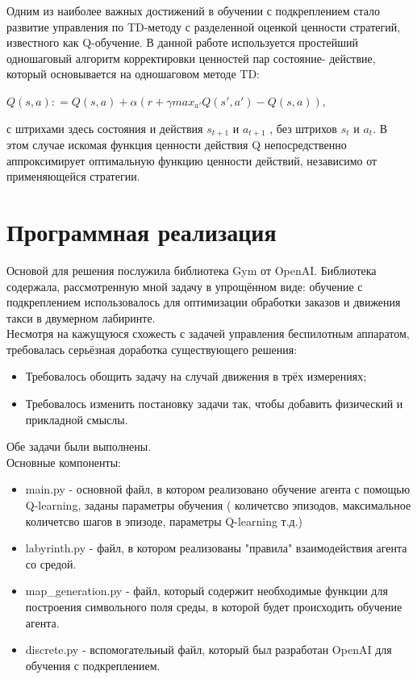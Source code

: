 \documentclass[12pt, a4paper]{report}
\theoremstyle{definition}
\theoremstyle{plain}
\theoremstyle{remark}
\theoremstyle{remark}
\theoremstyle{definition}
\begin{document}
Одним из наиболее важных достижений в обучении с подкреплением стало развитие управления по TD-методу с разделенной оценкой ценности
стратегий, известного как Q-обучение. В данной работе используется простейший одношаговый алгоритм корректировки ценностей пар состояние-
действие, который основывается на одношаговом методе TD:
\begin{center}
	$ Q(s, a): = Q(s, a) + \alpha(r + \gamma max_{a'} Q(s', a') - Q(s, a)), $
\end{center}
с штрихами здесь состояния и действия $ s_{t+1} $ и $ a_{t+1} $ , без штрихов $ s_{t} $ и $ a_{t} $. В этом случае искомая функция ценности действия Q непосредственно аппроксимирует оптимальную функцию ценности действий, независимо от применяющейся стратегии.
\section{Программная реализация}

Основой для решения послужила библиотека Gym от OpenAI. Библиотека содержала, рассмотренную мной задачу в упрощённом виде: обучение с подкреплением использовалось для оптимизации обработки заказов и движения такси в двумерном лабиринте.\\
Несмотря на кажущуюся схожесть с задачей управления беспилотным аппаратом, требовалась серьёзная доработка существующего решения:

\begin{itemize}
\item Требовалось обощить задачу на случай движения в трёх измерениях;
\item Требовалось изменить постановку задачи так, чтобы добавить физический и прикладной смыслы.
 \end{itemize}

Обе задачи были выполнены.\\ 

Основные компоненты:
\begin{itemize}
\item main.py - основной файл, в котором реализовано обучение агента с помощью Q-learning, заданы параметры обучения ( количетсво эпизодов, максимальное количетсво шагов в эпизоде, параметры Q-learning т.д.)
\item labyrinth.py - файл, в котором реализованы "правила" взаимодействия агента со средой.
\item map\_generation.py - файл, который содержит необходимые функции для построения символьного поля среды, в которой будет происходить обучение агента.
\item discrete.py - вспомогательный файл, который был разработан OpenAI для обучения с подкреплением.
 \end{itemize}
\end{document}

